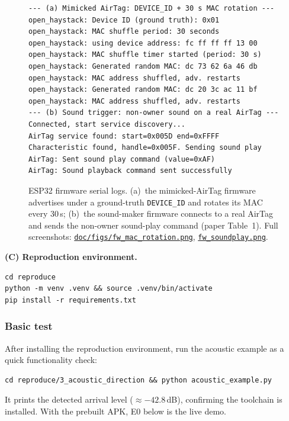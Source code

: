 \documentclass[nonacm,sigconf]{acmart}
\begin{document}
\begin{figure}[t]
\begin{lstlisting}[style=log]
--- (a) Mimicked AirTag: DEVICE_ID + 30 s MAC rotation ---
open_haystack: Device ID (ground truth): 0x01
open_haystack: MAC shuffle period: 30 seconds
open_haystack: using device address: fc ff ff ff 13 00
open_haystack: MAC shuffle timer started (period: 30 s)
open_haystack: Generated random MAC: dc 73 62 6a 46 db
open_haystack: MAC address shuffled, adv. restarts
open_haystack: Generated random MAC: dc 20 3c ac 11 bf
open_haystack: MAC address shuffled, adv. restarts
--- (b) Sound trigger: non-owner sound on a real AirTag ---
Connected, start service discovery...
AirTag service found: start=0x005D end=0xFFFF
Characteristic found, handle=0x005F. Sending sound play
AirTag: Sent sound play command (value=0xAF)
AirTag: Sound playback command sent successfully
\end{lstlisting}
  \caption{ESP32 firmware serial logs. (a)~the mimicked-AirTag firmware
  advertises under a ground-truth \texttt{DEVICE\_ID} and rotates its MAC every
  30\,s; (b)~the sound-maker firmware connects to a real AirTag and sends the
  non-owner sound-play command (paper Table~1). Full screenshots:
  \href{https://github.com/rzy0901/Snatcher/blob/main/doc/figs/fw_mac_rotation.png}{\texttt{doc/figs/fw\_mac\_rotation.png}},
  \href{https://github.com/rzy0901/Snatcher/blob/main/doc/figs/fw_soundplay.png}{\texttt{fw\_soundplay.png}}.}
  \label{fig:ae_fw}
\end{figure}

\noindent\textbf{(C) Reproduction environment.}
\begin{lstlisting}
cd reproduce
python -m venv .venv && source .venv/bin/activate
pip install -r requirements.txt
\end{lstlisting}

\subsubsection{Basic test}
After installing the reproduction environment, run the acoustic example as a
quick functionality check:
\begin{lstlisting}
cd reproduce/3_acoustic_direction && python acoustic_example.py
\end{lstlisting}
It prints the detected arrival level ($\approx-42.8$\,dB), confirming the
toolchain is installed. With the prebuilt APK, E0 below is the live demo.
\end{document}
